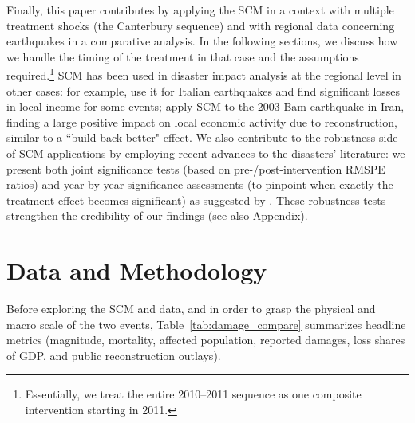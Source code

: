 \documentclass[12pt]{article}
\begin{document}
Finally, this paper contributes by applying the SCM in a context with multiple treatment shocks (the Canterbury sequence) and with regional data concerning earthquakes in a comparative analysis. In the following sections, we discuss how we handle the timing of the treatment in that case and the assumptions required.\footnote{Essentially, we treat the entire 2010–2011 sequence as one composite intervention starting in 2011.} SCM has been used in disaster impact analysis at the regional level in other cases: for example, \textcite{porcelli2019impact} use it for Italian earthquakes and find significant losses in local income for some events; \textcite{farzanegan2025bam} apply SCM to the 2003 Bam earthquake in Iran, finding a large positive impact on local economic activity due to reconstruction, similar to a “build-back-better" effect. We also contribute to the robustness side of SCM applications by employing recent advances to the disasters' literature: we present both joint significance tests (based on pre-/post-intervention RMSPE ratios) and year-by-year significance assessments (to pinpoint when exactly the treatment effect becomes significant) as suggested by \textcite{ferman2017placebo}. These robustness tests strengthen the credibility of our findings (see also Appendix).

\section{Data and Methodology}


Before exploring the SCM and data, and in order to grasp the physical and macro scale of the two events, Table~\ref{tab:damage_compare} summarizes headline metrics (magnitude, mortality, affected population, reported damages, loss shares of GDP, and public reconstruction outlays).\\
\end{document}
